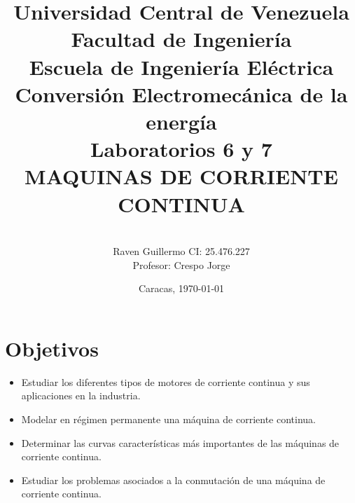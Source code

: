 \documentclass[11pt,letterpaper]{article}     %
\author{\\Raven Guillermo CI: 25.476.227\\Profesor: Crespo Jorge \vspace*{1in}}
\title{Universidad Central de Venezuela\\{ Facultad de Ingeniería\\Escuela de Ingeniería Eléctrica\\ Conversión Electromecánica de la energía\\\vspace*{1.5in} }Laboratorios 6 y 7\\MAQUINAS DE CORRIENTE CONTINUA\vspace*{1.35in}}
\date{Caracas, \today}
\begin{document}
\maketitle							%
\newpage
\tableofcontents
\newpage
\section{Objetivos}
\begin{itemize}
	\item Estudiar los diferentes tipos de motores de corriente continua y sus
    aplicaciones en la industria.
	\item Modelar en régimen permanente una máquina de corriente continua.
	\item Determinar las curvas características más importantes de las máquinas de
    corriente continua.
    \item Estudiar los problemas asociados a la conmutación de una máquina de
    corriente continua.
\end{itemize}
\end{document}
